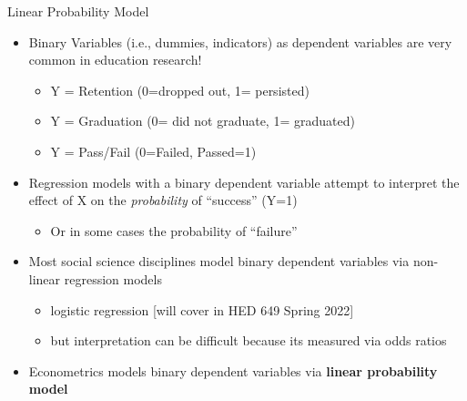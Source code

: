 \documentclass[
  8pt,
  ignorenonframetext,
  dvipsnames]{beamer}
\providecommand{\tightlist}{%
  \setlength{\itemsep}{0pt}\setlength{\parskip}{0pt}}
\renewcommand{\textbf}[1]{{\color{darkgray}\bfseries\fontfamily{Montserrat-TOsF}#1}}
\let\olditem\item
\renewcommand{\item}{%
  \olditem\vspace{4pt}
}
\begin{document}
\begin{frame}{Linear Probability Model}
\protect\hypertarget{linear-probability-model-1}{}

\begin{itemize}
\tightlist
\item
  Binary Variables (i.e., dummies, indicators) as dependent variables
  are very common in education research!

  \begin{itemize}
  \tightlist
  \item
    Y = Retention (0=dropped out, 1= persisted)
  \item
    Y = Graduation (0= did not graduate, 1= graduated)
  \item
    Y = Pass/Fail (0=Failed, Passed=1)
  \end{itemize}
\end{itemize}

\medskip

\begin{itemize}
\tightlist
\item
  Regression models with a binary dependent variable attempt to
  interpret the effect of X on the \emph{probability} of ``success''
  (Y=1)

  \begin{itemize}
  \tightlist
  \item
    Or in some cases the probability of ``failure''
  \end{itemize}
\end{itemize}

\medskip

\begin{itemize}
\tightlist
\item
  Most social science disciplines model binary dependent variables via
  non-linear regression models

  \begin{itemize}
  \tightlist
  \item
    logistic regression {[}will cover in HED 649 Spring 2022{]}
  \item
    but interpretation can be difficult because its measured via odds
    ratios\\
  \end{itemize}
\end{itemize}

\medskip

\begin{itemize}
\tightlist
\item
  Econometrics models binary dependent variables via \textbf{linear
  probability model}


\end{itemize}
\end{frame}
\end{document}
